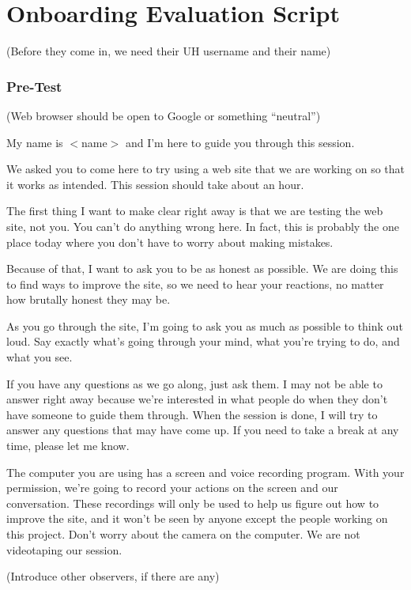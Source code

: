 \appendix
\chapter{Onboarding Evaluation Script}
\label{appendix:script}

(Before they come in, we need their UH username and their name)

\subsection{Pre-Test}

(Web browser should be open to Google or something ``neutral'')

My name is $<$name$>$ and I'm here to guide you through this session.

We asked you to come here to try using a web site that we are working on so that it works as intended.  This session should take about an hour.

The first thing I want to make clear right away is that we are testing the web site, not you.  You can't do anything wrong here.  In fact, this is probably the one place today where you don't have to worry about making mistakes.

Because of that, I want to ask you to be as honest as possible.  We are doing this to find ways to improve the site, so we need to hear your reactions, no matter how brutally honest they may be.

As you go through the site, I'm going to ask you as much as possible to think out loud.  Say exactly what's going through your mind, what you're trying to do, and what you see.

If you have any questions as we go along, just ask them.  I may not be able to answer right away because we're interested in what people do when they don't have someone to guide them through.  When the session is done, I will try to answer any questions that may have come up.  If you need to take a break at any time, please let me know.

The computer you are using has a screen and voice recording program.  With your permission, we're going to record your actions on the screen and our conversation.  These recordings will only be used to help us figure out how to improve the site, and it won't be seen by anyone except the people working on this project.  Don't worry about the camera on the computer.  We are not videotaping our session.

(Introduce other observers, if there are any)

